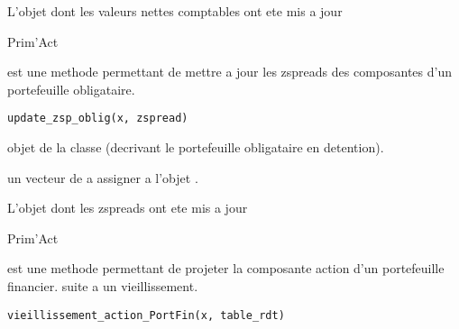 \documentclass[a4paper]{book}
\begin{document}
%
\begin{Value}
L'objet  dont les valeurs nettes comptables ont ete mis a jour
\end{Value}
%
\begin{Author}\relax
Prim'Act
\end{Author}
%
\begin{Description}\relax
{} est une methode permettant de mettre a jour les zspreads des composantes d'un portefeuille obligataire.
\end{Description}
%
\begin{Usage}
\begin{verbatim}
update_zsp_oblig(x, zspread)
\end{verbatim}
\end{Usage}
%
\begin{Arguments}
\begin{ldescription}
\item[\code{x}] objet de la classe  (decrivant le portefeuille obligataire en detention).

\item[\code{zspread}] un vecteur de  a assigner a l'objet .
\end{ldescription}
\end{Arguments}
%
\begin{Value}
L'objet  dont les zspreads ont ete mis a jour
\end{Value}
%
\begin{Author}\relax
Prim'Act
\end{Author}
%
\begin{Description}\relax
{} est une methode permettant de projeter la composante action d'un portefeuille financier.
suite a un vieillissement.
\end{Description}
%
\begin{Usage}
\begin{verbatim}
vieillissement_action_PortFin(x, table_rdt)
\end{verbatim}
\end{Usage}
\end{document}
